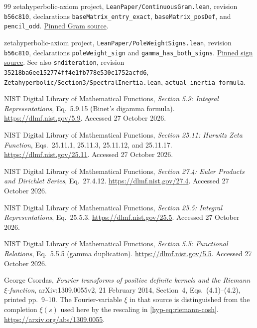 \documentclass[11pt,a4paper]{article}
\numberwithin{equation}{section}
\theoremstyle{definition}
\theoremstyle{remark}
\begin{document}
\begin{thebibliography}{99}
zetahyperbolic-axiom project,
\texttt{LeanPaper/ContinuousGram.lean}, revision \texttt{b56c810},
declarations \texttt{baseMatrix\_entry\_exact},
\texttt{baseMatrix\_posDef}, and \texttt{pencil\_odd}.
\href{https://github.com/randogelist/zetahyperbolic-axiom/blob/b56c8102d25b931a601992c93bf30b19cc7ee103/src/LeanPaper/ContinuousGram.lean}{Pinned Gram source}.

zetahyperbolic-axiom project,
\texttt{LeanPaper/PoleWeightSigns.lean}, revision \texttt{b56c810},
declarations \texttt{poleWeight\_sign} and
\texttt{gamma\_has\_both\_signs}.
\href{https://github.com/randogelist/zetahyperbolic-axiom/blob/b56c8102d25b931a601992c93bf30b19cc7ee103/src/LeanPaper/PoleWeightSigns.lean}{Pinned sign source}.
See also \texttt{snditeration}, revision
\texttt{35218ba6ee152774ff4e1fb778e530c1752acfd6},
\texttt{Zetahyperbolic/Section3/SpectralInertia.lean},
\texttt{actual\_inertia\_formula}.

NIST Digital Library of Mathematical Functions,
\emph{Section 5.9: Integral Representations}, Eq.~5.9.15
(Binet's digamma formula).
\url{https://dlmf.nist.gov/5.9}. Accessed 27 October 2026.

NIST Digital Library of Mathematical Functions,
\emph{Section 25.11: Hurwitz Zeta Function},
Eqs.~25.11.1, 25.11.3, 25.11.12, and 25.11.17.
\url{https://dlmf.nist.gov/25.11}. Accessed 27 October 2026.

NIST Digital Library of Mathematical Functions,
\emph{Section 27.4: Euler Products and Dirichlet Series}, Eq.~27.4.12.
\url{https://dlmf.nist.gov/27.4}. Accessed 27 October 2026.

NIST Digital Library of Mathematical Functions,
\emph{Section 25.5: Integral Representations}, Eq.~25.5.3.
\url{https://dlmf.nist.gov/25.5}. Accessed 27 October 2026.

NIST Digital Library of Mathematical Functions,
\emph{Section 5.5: Functional Relations}, Eq.~5.5.5
(gamma duplication).
\url{https://dlmf.nist.gov/5.5}. Accessed 27 October 2026.

George Csordas, \emph{Fourier transforms of positive definite kernels
and the Riemann $\xi$-function}, arXiv:1309.0055v2,
21 February 2014, Section~4, Eqs.~(4.1)--(4.2), printed pp.~9--10.
The Fourier-variable $\xi$ in that source is distinguished from
the completion $\xi(s)$ used here by the rescaling in
\eqref{hyp-eq:riemann-cosh}.
\url{https://arxiv.org/abs/1309.0055}.

\end{thebibliography}
\end{document}
